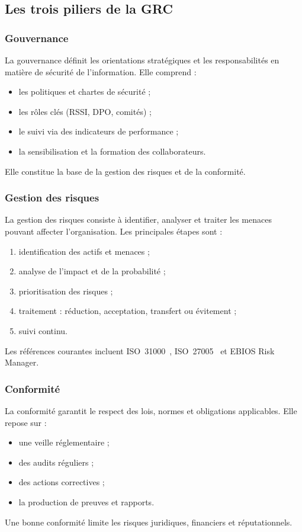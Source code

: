 \documentclass[a4paper,12pt,oneside]{report}
\begin{document}
	\subsection{Les trois piliers de la GRC}
	
	\subsubsection*{Gouvernance}
	La gouvernance d\'efinit les orientations strat\'egiques et les responsabilit\'es en mati\`ere de s\'ecurit\'e de l'information. Elle comprend :
	\begin{itemize}[leftmargin=1.5em,itemsep=2pt]
		\item les politiques et chartes de s\'ecurit\'e ;
		\item les r\^oles cl\'es (RSSI, DPO, comit\'es) ;
		\item le suivi via des indicateurs de performance ;
		\item la sensibilisation et la formation des collaborateurs.
	\end{itemize}
	Elle constitue la base de la gestion des risques et de la conformit\'e.
	
	\subsubsection*{Gestion des risques}
	La gestion des risques consiste \`a identifier, analyser et traiter les menaces pouvant affecter l'organisation. Les principales \'etapes sont :
	\begin{enumerate}[leftmargin=1.5em,itemsep=2pt]
		\item identification des actifs et menaces ;
		\item analyse de l'impact et de la probabilit\'e ;
		\item prioritisation des risques ;
		\item traitement : r\'eduction, acceptation, transfert ou \'evitement ;
		\item suivi continu.
	\end{enumerate}
	Les r\'ef\'erences courantes incluent ISO~31000~\cite{iso31000}, ISO~27005~\cite{iso27005} et EBIOS Risk Manager.
	
	\subsubsection*{Conformit\'e}
	La conformit\'e garantit le respect des lois, normes et obligations applicables. Elle repose sur :
	\begin{itemize}[leftmargin=1.5em,itemsep=2pt]
		\item une veille r\'eglementaire ;
		\item des audits r\'eguliers ;
		\item des actions correctives ;
		\item la production de preuves et rapports.
	\end{itemize}
	Une bonne conformit\'e limite les risques juridiques, financiers et r\'eputationnels.
\end{document}

